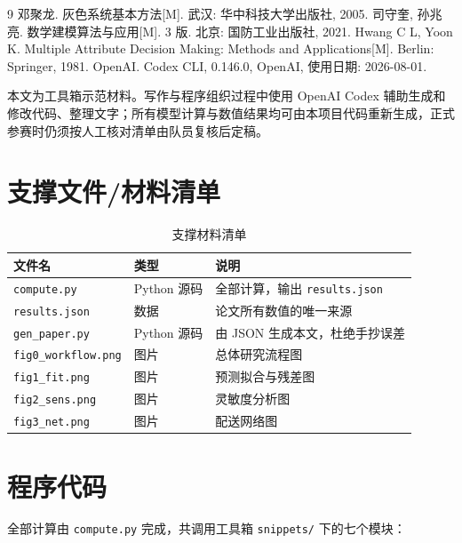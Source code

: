 \documentclass[12pt]{article}
\begin{document}
\begin{thebibliography}{9}
 邓聚龙. 灰色系统基本方法[M]. 武汉: 华中科技大学出版社, 2005.
 司守奎, 孙兆亮. 数学建模算法与应用[M]. 3 版. 北京: 国防工业出版社, 2021.
 Hwang C L, Yoon K. Multiple Attribute Decision Making: Methods and Applications[M]. Berlin: Springer, 1981.
 OpenAI. Codex CLI, 0.146.0, OpenAI, 使用日期: 2026-08-01.
\end{thebibliography}

\begin{aideclaration}[AI 工具使用声明]

本文为工具箱示范材料。写作与程序组织过程中使用 OpenAI Codex 辅助生成和修改代码、整理文字；所有模型计算与数值结果均可由本项目代码重新生成，正式参赛时仍须按人工核对清单由队员复核后定稿。
\end{aideclaration}

\appendix
\section{支撑文件/材料清单}

\begin{table}[!htbp]
  \centering
  \small
  \caption{支撑材料清单}
  \label{tab:support}
  \begin{tabular}{lll}
    \toprule
    文件名 & 类型 & 说明 \\
    \midrule
    \texttt{compute.py} & Python 源码 & 全部计算，输出 \texttt{results.json} \\
    \texttt{results.json} & 数据 & 论文所有数值的唯一来源 \\
    \texttt{gen\_paper.py} & Python 源码 & 由 JSON 生成本文，杜绝手抄误差 \\
    \texttt{fig0\_workflow.png} & 图片 & 总体研究流程图 \\
    \texttt{fig1\_fit.png} & 图片 & 预测拟合与残差图 \\
    \texttt{fig2\_sens.png} & 图片 & 灵敏度分析图 \\
    \texttt{fig3\_net.png} & 图片 & 配送网络图 \\
    \bottomrule
  \end{tabular}
\end{table}

\section{程序代码}

全部计算由 \texttt{compute.py} 完成，共调用工具箱 \texttt{snippets/} 下的七个模块：
\end{document}
